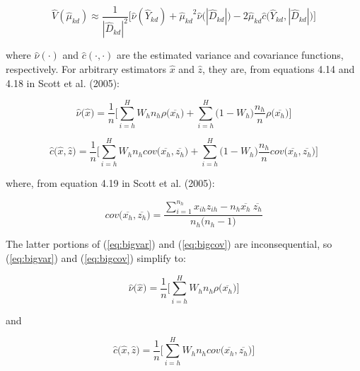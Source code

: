 \documentclass[12pt]{article}
\begin{document}
 \begin{equation}
\hat{V}(\hat{\mu}_{kd}) \approx \frac{1}{{|\hat{D}_{kd}|}^2} \Big[ \hat{\nu}(\hat{Y}_{kd}) + {\hat{\mu}_{kd}}^2 \hat{\nu} \big( |\hat{D}_{kd}| \big) - 
2\hat{\mu}_{kd}\hat{c}\big(\hat{Y}_{kd},  |\hat{D}_{kd}| \big) \Big]
\end{equation}

where $\hat{\nu}(\cdot)$ and $\hat{c}(\cdot, \cdot)$ are the estimated variance and covariance functions, respectively.  For arbitrary estimators $\hat{x}$ and $\hat{z}$, they are, from equations 4.14 and 4.18 in Scott et al. (2005):

 \begin{equation} \label{eq:bigvar}
\hat{\nu}\big( \hat{x} \big) = \frac{1}{n} \Big[ \displaystyle\sum_{i=h}^{H} W_h n_h\rho\big(\overline{x_{h}}\big) +  
\displaystyle\sum_{i=h}^{H} \big(1 - W_h) \frac{ n_h}{n}\rho\big(\overline{x_h}\big)    \Big]
\end{equation}

 \begin{equation} \label{eq:bigcov}
\hat{c}\big(\hat{x}, \hat{z}\big) = \frac{1}{n} \Big[ \displaystyle\sum_{i=h}^{H} W_h n_h cov\big(\overline{x_h}, \overline{z_h}\big) +  
\displaystyle\sum_{i=h}^{H} \big(1 - W_h) \frac{ n_h}{n}cov\big(\overline{x_h}, \overline{z_h}\big)    \Big]
\end{equation}

where, from equation 4.19 in Scott et al. (2005):

\begin{equation}
cov\big(\overline{x_h}, \overline{z_h}\big) = \frac{\displaystyle\sum_{i=1}^{n_h}x_{ih}z_{ih}-n_h\overline{x_h} ~ \overline{z_{h}}}{n_h\big(n_h-1\big)}
\end{equation}

The latter portions of (\ref{eq:bigvar}) and (\ref{eq:bigcov}) are inconsequential, so (\ref{eq:bigvar}) and (\ref{eq:bigcov}) simplify to: 

 \begin{equation} \label{eq:bigvar_trunc}
\hat{\nu}\big( \hat{x} \big) = \frac{1}{n} \Big[ \displaystyle\sum_{i=h}^{H} W_h n_h\rho\big(\overline{x_{h}}\big)   \Big]
\end{equation}

and

 \begin{equation} \label{eq:bigcov_trunc}
\hat{c}\big(\hat{x}, \hat{z}\big) = \frac{1}{n} \Big[ \displaystyle\sum_{i=h}^{H} W_h n_h cov\big(\overline{x_h}, \overline{z_h}\big)    \Big] 
\end{equation}
\end{document}
